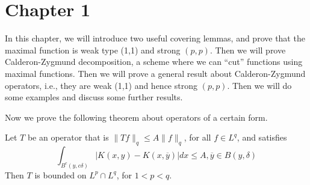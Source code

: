 \chapter{Chapter 1}
In this chapter, we will introduce two useful covering lemmas, and prove that the maximal function is weak type (1,1) and strong $(p,p)$. Then we will prove Calderon-Zygmund decomposition, a scheme where we can ``cut'' functions using maximal functions. Then we will prove a general result about Calderon-Zygmund operators, i.e., they are weak (1,1) and hence strong $(p,p)$. Then we will do some examples and discuss some further results.



Now we prove the following theorem about operators of a certain form.
\begin{thm}
    Let $T$ be an operator that is $\|Tf\|_q\leq A\|f\|_q$, for all $f\in L^q$, and satisfies 
    \begin{equation*}
        \int_{B^c(y,c\delta)}|K(x,y)-K(x,\overline{y})|dx\leq A, \overline{y}\in B(y,\delta)
    \end{equation*}
    Then $T$ is bounded on $L^p\cap L^q$, for $1<p<q$.
\end{thm}
